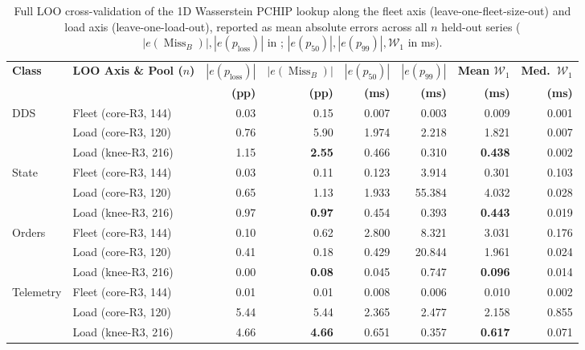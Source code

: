 \documentclass[11pt,a4paper]{article}
\newcommand{\MissB}{\ensuremath{\operatorname{Miss}_B}}
\newcommand{\ploss}{\ensuremath{p_{\mathrm{loss}}}}
\newcommand{\Wone}{\ensuremath{\mathcal{W}_1}}
\begin{document}
\begin{table}[!tb]
\centering
\scriptsize
\setlength{\tabcolsep}{3.0pt}
\caption{Full LOO cross-validation of the 1D Wasserstein PCHIP lookup along the fleet axis (leave-one-fleet-size-out) and load axis (leave-one-load-out), reported as mean absolute errors across all $n$ held-out series ($|e(\MissB)|, |e(\ploss)|$ in \si{\pp}; $|e(p_{50})|, |e(p_{99})|, \Wone$ in \si{\milli\second}).}
\label{tab:pchip_axes}
\begin{tabular}{@{}l l r r r r r r@{}}
\toprule
\textbf{Class} & \textbf{LOO Axis \& Pool ($n$)} & \textbf{$|e(\ploss)|$} & \textbf{$|e(\MissB)|$} & \textbf{$|e(p_{50})|$} & \textbf{$|e(p_{99})|$} & \textbf{Mean $\Wone$} & \textbf{Med.\ $\Wone$} \\
 & & \textbf{(pp)} & \textbf{(pp)} & \textbf{(ms)} & \textbf{(ms)} & \textbf{(ms)} & \textbf{(ms)} \\
\midrule
DDS & Fleet (core-R3, 144) & 0.03 & 0.15 & 0.007 & 0.003 & 0.009 & 0.001 \\
 & Load (core-R3, 120) & 0.76 & 5.90 & 1.974 & 2.218 & 1.821 & 0.007 \\
 & Load (knee-R3, 216) & 1.15 & \textbf{2.55} & 0.466 & 0.310 & \textbf{0.438} & 0.002 \\
\addlinespace[2pt]
State & Fleet (core-R3, 144) & 0.03 & 0.11 & 0.123 & 3.914 & 0.301 & 0.103 \\
 & Load (core-R3, 120) & 0.65 & 1.13 & 1.933 & 55.384 & 4.032 & 0.028 \\
 & Load (knee-R3, 216) & 0.97 & \textbf{0.97} & 0.454 & 0.393 & \textbf{0.443} & 0.019 \\
\addlinespace[2pt]
Orders & Fleet (core-R3, 144) & 0.10 & 0.62 & 2.800 & 8.321 & 3.031 & 0.176 \\
 & Load (core-R3, 120) & 0.41 & 0.18 & 0.429 & 20.844 & 1.961 & 0.024 \\
 & Load (knee-R3, 216) & 0.00 & \textbf{0.08} & 0.045 & 0.747 & \textbf{0.096} & 0.014 \\
\addlinespace[2pt]
Telemetry & Fleet (core-R3, 144) & 0.01 & 0.01 & 0.008 & 0.006 & 0.010 & 0.002 \\
 & Load (core-R3, 120) & 5.44 & 5.44 & 2.365 & 2.477 & 2.158 & 0.855 \\
 & Load (knee-R3, 216) & 4.66 & \textbf{4.66} & 0.651 & 0.357 & \textbf{0.617} & 0.071 \\
\bottomrule
\end{tabular}
\end{table}
\end{document}
